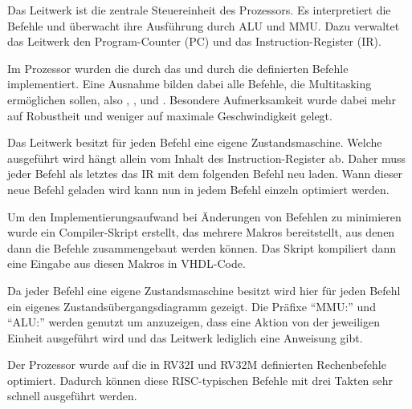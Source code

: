 Das Leitwerk ist die zentrale Steuereinheit des Prozessors. Es interpretiert
die Befehle und \"uberwacht ihre Ausf\"uhrung durch ALU und MMU. Dazu verwaltet
das Leitwerk den Program-Counter (PC) und das Instruction-Register (IR).

Im Prozessor wurden die durch das 
und durch die  definierten Befehle implementiert. Eine Ausnahme bilden dabei alle
Befehle, die Multitasking erm\"oglichen sollen, also 
\nolinebreak{}, \nolinebreak{},  und
. Besondere Aufmerksamkeit wurde dabei mehr auf Robustheit und
weniger auf maximale Geschwindigkeit gelegt.

Das Leitwerk besitzt f\"ur jeden Befehl eine eigene Zustandsmaschine. Welche
ausgef\"uhrt wird h\"angt allein vom Inhalt des Instruction-Register ab. Daher
muss jeder Befehl als letztes das IR mit dem folgenden Befehl neu laden. Wann
dieser neue Befehl geladen wird kann nun in jedem Befehl einzeln optimiert
werden.

Um den Implementierungsaufwand bei \"Anderungen von Befehlen zu minimieren
wurde ein Compiler-Skript erstellt, das mehrere Makros bereitstellt, aus denen
dann die Befehle zusammengebaut werden k\"onnen. Das Skript kompiliert dann
eine Eingabe aus diesen Makros in VHDL-Code.

Da jeder Befehl eine eigene Zustandsmaschine besitzt wird hier f\"ur jeden
Befehl ein eigenes Zustands\-\"uber\-gangs\-dia\-gramm gezeigt. Die Pr\"afixe
``MMU:'' und ``ALU:'' werden genutzt um anzuzeigen, dass eine Aktion von der
jeweiligen Einheit ausgef\"uhrt wird und das Leitwerk lediglich eine Anweisung
gibt.

Der Prozessor wurde auf die in RV32I und RV32M definierten Rechenbefehle
optimiert. Dadurch k\"onnen diese RISC-typischen Befehle mit drei Takten sehr
schnell ausgef\"uhrt werden.



